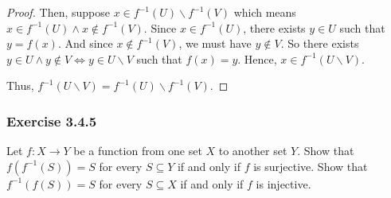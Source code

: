 \documentclass[12pt, letter]{article}
\begin{document}
\begin{enumerate}
\begin{proof}
        Then, suppose $x\in f^{-1}(U)\backslash f^{-1}(V)$ which means $x\in f^{-1}(U) \land x\notin f^{-1}(V)$. Since $x\in f^{-1}(U)$, there exists $y\in U$ such that $y=f(x)$. And since $x\notin f^{-1}(V)$, we must have $y\notin V$.
        So there exists $y\in U \land y\notin V \iff y\in U\backslash V$ such that $f(x)=y$. Hence, $x\in f^{-1}(U\backslash V)$.

        Thus, $f^{-1}(U\backslash V)=f^{-1}(U)\backslash f^{-1}(V)$.
    \end{proof}
\end{enumerate}
\subsubsection*{Exercise 3.4.5}
Let $f:X\to Y$ be a function from one set $X$ to another set $Y$. Show that $f(f^{-1}(S))=S$ for every $S\subseteq Y$ if and only if $f$ is surjective. 
Show that $f^{-1}(f(S))=S$ for every $S\subseteq X$ if and only if $f$ is injective.
\end{document}
